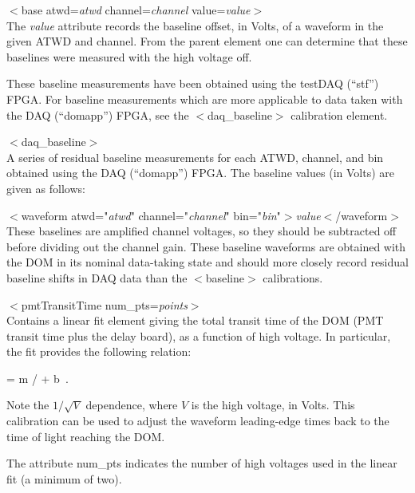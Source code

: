 \documentclass[10pt]{article}
\begin{document}
\bi
\item{$<$base atwd=\textit{atwd} channel=\textit{channel}
  value=\textit{value}$>$}\\ 
The \textit{value} attribute records the baseline offset, in Volts, of
a waveform in the given ATWD and channel.  From the parent element one can
determine that these baselines were measured with the high voltage off.
\ei

These baseline measurements have been obtained using the testDAQ (``stf'')
FPGA.  For baseline measurements which are more applicable to data taken
with the DAQ (``domapp'') FPGA, see the $<$daq\_baseline$>$ calibration element.


\item{$<$daq\_baseline$>$}\\ 
A series of residual baseline measurements for each ATWD, channel, and bin
obtained using the DAQ (``domapp'') FPGA.  The baseline values (in
Volts) are given as follows:\\

\bi
\item{$<$waveform atwd="\textit{atwd}" channel="\textit{channel}"
  bin="\textit{bin}"$>$\textit{value}$<$/waveform$>$}\\
\ei
These baselines are amplified channel voltages, so they should be
subtracted off before dividing out the channel gain.  These baseline
waveforms are obtained with the DOM in its nominal data-taking state and
should more closely record residual baseline shifts in DAQ data than
the $<$baseline$>$ calibrations.  


\item{$<$pmtTransitTime num\_pts=\textit{points}$>$}\\
Contains a linear fit element giving the total transit time of the DOM (PMT
transit time plus the delay board), as a function of high voltage.  In
particular, the fit provides the following relation:

\be
{} = m /  + b\ .
\ee

Note the $1/\sqrt{V}$ dependence, where $V$ is the high voltage, in Volts.
This calibration can be used to adjust the waveform leading-edge times back
to the time of light reaching the DOM.

The attribute num\_pts indicates the number of high voltages used in the
linear fit (a minimum of two).

\end{document}
